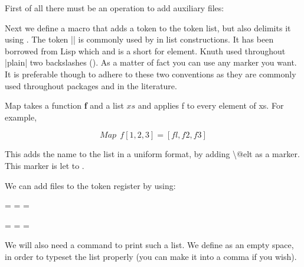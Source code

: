 \begin{teX}
\newtoks\auxlist 
\newcount\auxcount
\end{teX}

\newtoks\auxlist 
\newcount\auxcount

First of all there must be an operation to add auxiliary files:

\begin{teX}
\def\NewAuxFile#1{\AddToAuxList{#1}%
}
\end{teX}

\def\NewAuxFile#1{\AddToAuxList{#1}%
}

\noindent Next we define a macro that adds a token to the token list, but also delimits it using . The token |\@elt| is commonly used by \latex in list constructions. It has been borrowed from Lisp which and is a short for element. Knuth used throughout |plain| two backslashes (\BS\BS). As a matter of fact you can use any marker you want. It is preferable though to adhere to these two conventions as they are commonly used throughout packages and in the literature.

Map takes a function \textbf{f} and a list $xs$ and applies f
to every element of xs. For example,

$$
Map~~f[1,2,3] = [fl,f2,f3]
$$

\begin{teX}
\def\AddToAuxList#1{\let\@elt=\relax
  \edef\act{\noexpand\auxlist={\the\auxlist \@elt{#1}}}%
\act}
\end{teX}

\makeatletter
\def\AddToAuxList#1{\let\@elt=\relax
  \edef\act{\noexpand\auxlist={\the\auxlist \@elt {#1}}}%
\act}


This adds the name to the list in a uniform format, by adding \textbackslash @elt as a marker. This marker is let to .

We can add files to the token register by using:

\begin{teX}
\NewAuxFile{toc} \NewAuxFile{lof} \NewAuxFile{lot}
\end{teX}
\NewAuxFile{toc} \NewAuxFile{lof} \NewAuxFile{lot}


We will also need a command to print such a list. We define  as an empty space, in order to typeset the list properly (you can make it into a comma if you wish).




\begin{teX}
\def\PrintAuxList{%
  \def\@elt{ }
  \the\auxlist}
\end{teX}

